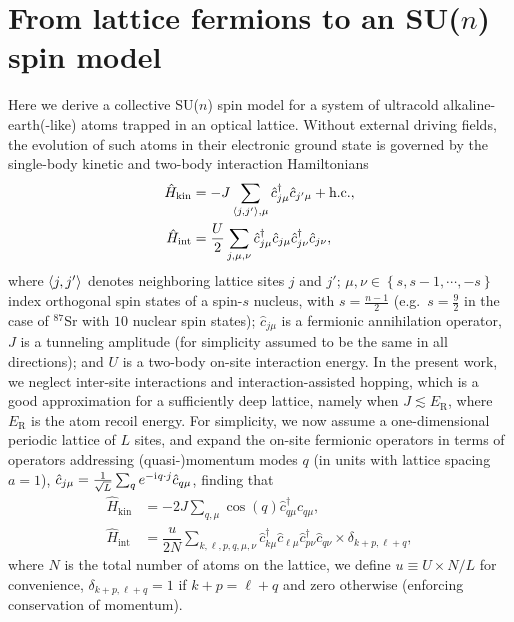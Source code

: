 \documentclass[aps,pra,nofootinbib,twocolumn,superscriptaddress]{revtex4-2}
\renewcommand{\t}{\text} %
\newcommand{\f}[2]{\dfrac{#1}{#2}} %
\newcommand{\p}[1]{\left(#1\right)} %
\renewcommand{\set}[1]{\left\{#1\right\}} %
\newcommand{\bk}{\braket} %
\renewcommand{\i}{\mathrm{i}\mkern1mu} %
\newcommand{\1}{\mathds{1}}
\renewcommand{\c}{\hat c}
\renewcommand{\H}{\hat H}
\begin{document}
\section{From lattice fermions to an SU($n$) spin model}
\label{sec:spin_model}

Here we derive a collective SU($n$) spin model for a system of ultracold alkaline-earth(-like) atoms trapped in an optical lattice.
Without external driving fields, the evolution of such atoms in their electronic ground state is governed by the single-body kinetic and two-body interaction Hamiltonians
\begin{align}
  \H_{\t{kin}}
  &= -J \sum_{\bk{j,j'},\mu} \c_{j\mu}^\dag \c_{j'\mu} + \t{h.c.},
  \label{eq:H_kin_FH} \\
  \H_{\t{int}}
  &= \f{U}{2} \sum_{j,\mu,\nu}
  \c_{j\mu}^\dag \c_{j\mu} \c_{j\nu}^\dag \c_{j\nu},
  \label{eq:H_int_FH}
\end{align}
where $\bk{j,j'}$ denotes neighboring lattice sites $j$ and $j'$; $\mu,\nu\in\set{s,s-1,\cdots,-s}$ index orthogonal spin states of a spin-$s$ nucleus, with $s=\frac{n-1}{2}$ (e.g.~$s=\frac{9}{2}$ in the case of ${}^{87}$Sr with $10$ nuclear spin states); $\c_{j\mu}$ is a fermionic annihilation operator, $J$ is a tunneling amplitude (for simplicity assumed to be the same in all directions); and $U$ is a two-body on-site interaction energy.
In the present work, we neglect inter-site interactions and interaction-assisted hopping, which is a good approximation for a sufficiently deep lattice, namely when $J\lesssim E_{\t{R}}$, where $E_{\t{R}}$ is the atom recoil energy.
For simplicity, we now assume a one-dimensional periodic lattice of $L$ sites, and expand the on-site fermionic operators in terms of operators addressing (quasi-)momentum modes $q$ (in units with lattice spacing $a=1$), $\c_{j\mu} = \frac1{\sqrt{L}} \sum_q e^{-\i q\cdot j} \c_{q\mu}$, finding that
\begin{align}
  \H_{\t{kin}}
  &= -2J\sum_{q,\mu} \cos\p{q} \c_{q\mu}^\dag \c_{q\mu}, \\
  \H_{\t{int}}
  &= \f{u}{2N} \sum_{k,\ell,p,q,\mu,\nu}
  \c_{k\mu}^\dag \c_{\ell\mu} \c_{p\nu}^\dag \c_{q\nu}
  \times \delta_{k+p,\ell+q},
  \label{eq:H_int_momenta}
\end{align}
where $N$ is the total number of atoms on the lattice, we define $u\equiv U\times N/L$ for convenience, $\delta_{k+p,\ell+q}=1$ if $k+p=\ell+q$ and zero otherwise (enforcing conservation of momentum).
\end{document}

